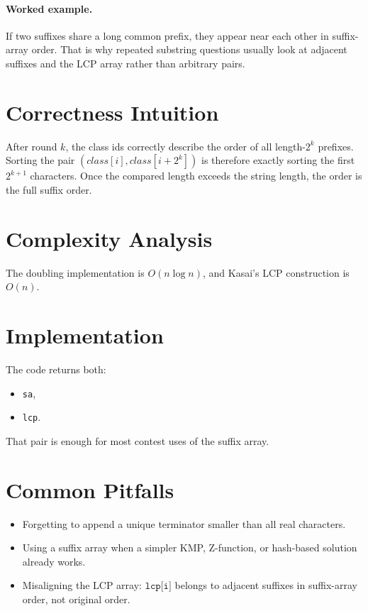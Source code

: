 \paragraph{Worked example.}
If two suffixes share a long common prefix, they appear near each other in suffix-array order. That is why repeated
substring questions usually look at adjacent suffixes and the LCP array rather than arbitrary pairs.

\section*{Correctness Intuition}

After round \(k\), the class ids correctly describe the order of all length-\(2^k\) prefixes. Sorting the pair
\((class[i], class[i + 2^k])\) is therefore exactly sorting the first \(2^{k+1}\) characters. Once the compared length
exceeds the string length, the order is the full suffix order.

\section*{Complexity Analysis}

The doubling implementation is \(O(n \log n)\), and Kasai's LCP construction is \(O(n)\).

\section*{Implementation}

The code returns both:

\begin{itemize}
  \item \texttt{sa},
  \item \texttt{lcp}.
\end{itemize}

That pair is enough for most contest uses of the suffix array.

\section*{Common Pitfalls}

\begin{itemize}
  \item Forgetting to append a unique terminator smaller than all real characters.
  \item Using a suffix array when a simpler KMP, Z-function, or hash-based solution already works.
  \item Misaligning the LCP array: \(\texttt{lcp[i]}\) belongs to adjacent suffixes in suffix-array order, not original order.
\end{itemize}

